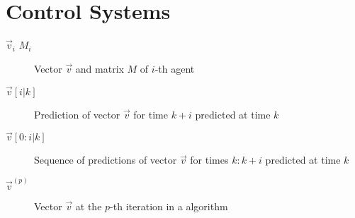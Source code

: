 \documentclass[../main.tex]{subfiles}
\begin{document}
\section*{Control Systems}

\begin{description}

  \item[$\vec{v}_{i}$ $M_{i}$] Vector $\vec{v}$ and matrix $M$ of $i$-th agent
  \item[${\vec{v}[i|k]}$] Prediction of vector $\vec{v}$ for time ${k+i}$ predicted at time $k$
  \item[${\vec{v}[0:i|k]}$] Sequence of predictions of vector $\vec{v}$ for times $k:k+i$ predicted at time $k$
  \item[$\vec{v}^{(p)}$ ] Vector $\vec{v}$ at the $p$-th iteration in a algorithm
\end{description}
\end{document}
